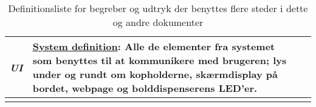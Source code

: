 \documentclass[Kravspecifikation/Kravspec_Main.tex]{subfiles}
\begin{document}
\begin{longtable}{|>{\centering\arraybackslash}m{3cm}|>{\RaggedRight\arraybackslash}m{10cm}| p{} | p{}|}
        \textit{\textbf{UI}} & \underline{System definition}:
        Alle de elementer fra systemet som benyttes til at kommunikere med brugeren; lys under og rundt om kopholderne, skærmdisplay på bordet, webpage og bolddispenserens LED'er.\\
        \hline
    \caption{Definitionsliste for begreber og udtryk der benyttes flere steder i dette og andre dokumenter}
    \label{tab:def_liste}
    \end{longtable}
\end{document}
